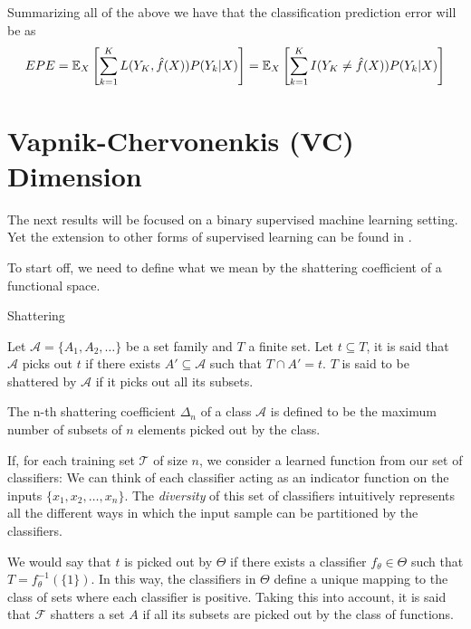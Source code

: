 
Summarizing all of the above we have that the classification prediction error will be as
\begin{equation}
EPE = \operatorname{\mathbb{E}}_X\left[ \sum_{k=1}^{K} L( Y_K , \hat{f}(X) ) P(Y_k|X) \right] =
\operatorname{\mathbb{E}}_X\left[ \sum_{k=1}^{K} I(Y _K\neq \hat{f}(X)) P(Y_k|X) \right]
\end{equation}\label{eq:classificationEPE}


\section{Vapnik-Chervonenkis (VC) Dimension }\label{appx:sec:vcDimension}

The next results will be focused on a binary supervised machine learning setting.
Yet the extension to other forms of supervised learning can be found in \textcite{cherkassky-learning2007}.


To start off, we need to define what we mean by the shattering coefficient of a functional space.

\begin{definition}{Shattering}

Let $\mathcal {A}= \{A_1,A_{2},\dots \}$ be a set family and $T$ a finite set.
Let $t \subseteq T$, it is said that $\mathcal {A}$ picks out $t$ if there exists $A' \subseteq \mathcal {A} $ such that $ T \cap A' = t$.
$T$ is said to be shattered by $\mathcal {A}$ if it picks out all its subsets.


\end{definition}

The n-th shattering coefficient $\Delta_n$ of a class $\mathcal {A}$ is defined to be the maximum number of subsets of $n$ elements picked out by the class.

If, for each training set $\mathcal {T}$ of size $n$, we consider a learned function from our set of classifiers:
We can think of each classifier acting as an indicator function on the inputs $\{ x_1,x_2,\ldots,x_n \}$.
The \textit{diversity} of this set of classifiers intuitively represents all the different ways in which the input sample can be partitioned by the classifiers.

We would say that $t$ is picked out by $\Theta$ if there exists a classifier $f_{\theta} \in \Theta$ such that $T = f_{\theta}^{-1}(\{1\})$.
In this way, the classifiers in $\Theta$ define a unique mapping to the class of sets where each classifier is positive.
Taking this into account, it is said that $\mathcal {F}$ shatters a set $A$ if all its subsets are picked out by the class of functions.

